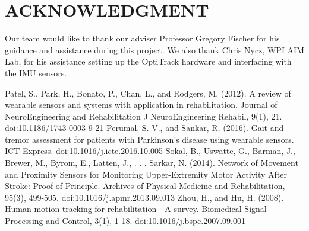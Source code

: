 \documentclass[letterpaper, 10 pt, conference]{ieeeconf}  %
\begin{document}
\section*{ACKNOWLEDGMENT}
Our team would like to thank our adviser Professor Gregory Fischer for his guidance and assistance during this project. We also thank Chris Nycz, WPI AIM Lab, for his assistance setting up the OptiTrack hardware and interfacing with the IMU sensors.  

\begin{thebibliography}{99}

 Patel, S., Park, H., Bonato, P., Chan, L., and Rodgers, M. (2012). A review of wearable sensors and systems with application in rehabilitation. Journal of NeuroEngineering and Rehabilitation J NeuroEngineering Rehabil, 9(1), 21. doi:10.1186/1743-0003-9-21
 Perumal, S. V., and Sankar, R. (2016). Gait and tremor assessment for patients with Parkinson’s disease using wearable sensors. ICT Express. doi:10.1016/j.icte.2016.10.005
 Sokal, B., Uswatte, G., Barman, J., Brewer, M., Byrom, E., Latten, J., . . . Sarkar, N. (2014). Network of Movement and Proximity Sensors for Monitoring Upper-Extremity Motor Activity After Stroke: Proof of Principle. Archives of Physical Medicine and Rehabilitation, 95(3), 499-505. doi:10.1016/j.apmr.2013.09.013
 Zhou, H., and Hu, H. (2008). Human motion tracking for rehabilitation—A survey. Biomedical Signal Processing and Control, 3(1), 1-18. doi:10.1016/j.bspc.2007.09.001 

\end{thebibliography}
\end{document}
